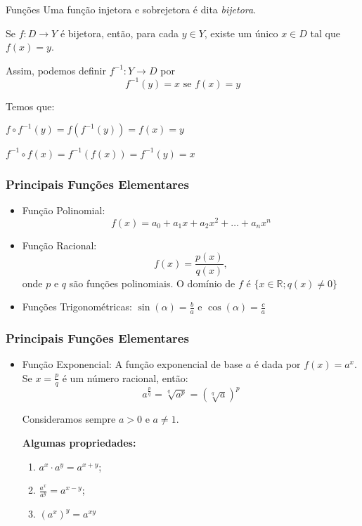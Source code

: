 \documentclass[hyperref={pdfpagelabels=false}]{beamer}
\begin{document}
\begin{frame}{Funções}
Uma função injetora e sobrejetora é dita {\it bijetora}. \pause

Se $f: D \rightarrow Y$ é bijetora, então, para cada $y \in Y$, existe um único $x \in D$ tal que $f(x)=y$. \pause

Assim, podemos definir $f^{-1}:Y \rightarrow D$ por 
$$f^{-1}(y) = x \text{ se } f(x) = y$$ \pause

Temos que:

$f \circ f^{-1}(y) = f(f^{-1}(y)) = f(x) = y$ 

$f^{-1} \circ f(x) = f^{-1}(f(x)) = f^{-1}(y) = x $
\end{frame}


\begin{frame}
\frametitle{Principais Funções Elementares}

\begin{itemize}
 \item Função Polinomial: \pause $$f(x) = a_0+a_1x+a_2x^2+\dots+a_nx^n$$ \pause
 \item Função Racional: \pause $$f(x) = \frac{p(x)}{q(x)},$$ onde $p$ e $q$ são funções polinomiais. O domínio de $f$ é $\{x \in \mathbb{R}; q(x) \neq 0 \}$ \pause
 \item Funções Trigonométricas: \pause $\sin (\alpha) = \displaystyle \frac{b}{a}$ e $\cos(\alpha) = \displaystyle \frac{c}{a}$
\end{itemize}

\end{frame}


\begin{frame}
\frametitle{Principais Funções Elementares}

\begin{itemize}
 \item Função Exponencial: \pause A função exponencial de base $a$ é dada por $f(x) = a^{x}$. Se $x = \frac{p}{q}$ é um número racional, então:
$$a^{\frac{p}{q}} = \sqrt[q]{a^p} = (\sqrt[q]{a})^{p}$$ \pause

Consideramos sempre $a>0$ e $a \neq 1$. \pause

\textbf{Algumas propriedades:}
\begin{enumerate}
	\item $a^{x} \cdot a^{y} = a^{x+y}$; \pause
	\item $\displaystyle \frac{a^{x}}{a^{y}} = a^{x-y}$; \pause
	\item $(a^{x})^{y} = a^{xy}$ \pause
\end{enumerate}

\end{itemize}

\end{frame}
\end{document}
